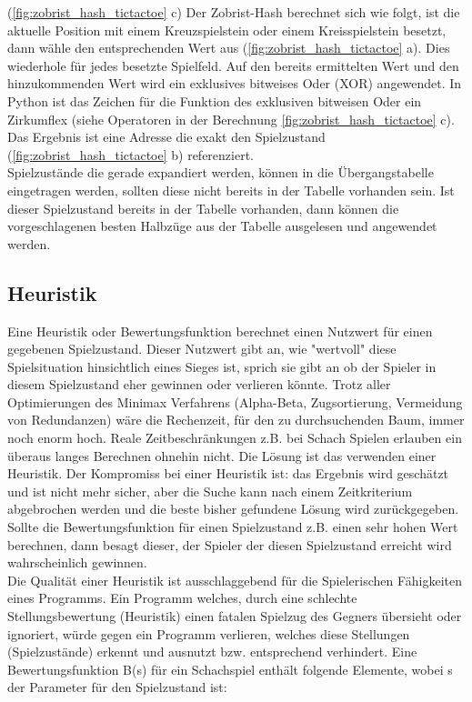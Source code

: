 (\ref{fig:zobrist_hash_tictactoe} c) Der Zobrist-Hash berechnet sich wie folgt, ist die aktuelle Position mit einem Kreuzspielstein oder einem Kreisspielstein besetzt, dann wähle den entsprechenden Wert aus (\ref{fig:zobrist_hash_tictactoe} a). Dies wiederhole für jedes besetzte Spielfeld. Auf den bereits ermittelten Wert und den hinzukommenden Wert wird ein exklusives bitweises Oder (XOR) angewendet. In Python ist das Zeichen für die Funktion des exklusiven bitweisen Oder ein Zirkumflex (siehe Operatoren in der Berechnung \ref{fig:zobrist_hash_tictactoe} c). Das Ergebnis ist eine Adresse die exakt den Spielzustand (\ref{fig:zobrist_hash_tictactoe} b) referenziert. \\

Spielzustände die gerade expandiert werden, können in die Übergangstabelle eingetragen werden, sollten diese nicht bereits in der Tabelle vorhanden sein. Ist dieser Spielzustand bereits in der Tabelle vorhanden, dann können die vorgeschlagenen besten Halbzüge aus der Tabelle ausgelesen und angewendet werden. \\

\subsection{Heuristik}
\label{subsec:Heuristik}
Eine Heuristik oder Bewertungsfunktion berechnet einen Nutzwert für einen gegebenen Spielzustand. Dieser Nutzwert gibt an, wie "wertvoll" diese Spielsituation hinsichtlich eines Sieges ist, sprich sie gibt an ob der Spieler in diesem Spielzustand eher gewinnen oder verlieren könnte. Trotz aller Optimierungen des Minimax Verfahrens (Alpha-Beta, Zugsortierung, Vermeidung von Redundanzen) wäre die Rechenzeit, für den zu durchsuchenden Baum, immer noch enorm hoch. Reale Zeitbeschränkungen z.B. bei Schach Spielen erlauben ein überaus langes Berechnen ohnehin nicht. Die Lösung ist das verwenden einer Heuristik. Der Kompromiss bei einer Heuristik ist: das Ergebnis wird geschätzt und ist nicht mehr sicher, aber die Suche kann nach einem Zeitkriterium abgebrochen werden und die beste bisher gefundene Lösung wird zurückgegeben. Sollte die Bewertungsfunktion für einen Spielzustand z.B. einen sehr hohen Wert berechnen, dann besagt dieser, der Spieler der diesen Spielzustand erreicht wird wahrscheinlich gewinnen. \\

Die Qualität einer Heuristik ist ausschlaggebend für die Spielerischen Fähigkeiten eines Programms. Ein Programm welches, durch eine schlechte Stellungsbewertung (Heuristik) einen fatalen Spielzug des Gegners übersieht oder ignoriert, würde gegen ein Programm verlieren, welches diese Stellungen (Spielzustände) erkennt und ausnutzt bzw. entsprechend verhindert. Eine Bewertungsfunktion B(s) für ein Schachspiel enthält folgende Elemente, wobei s der Parameter für den Spielzustand ist\cite[119]{Ertel}: \\

